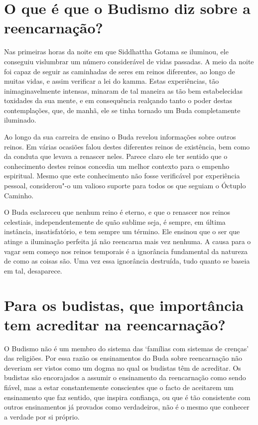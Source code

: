 \section{O que é que o Budismo diz sobre a reencarnação?}

Nas primeiras horas da noite em que Siddhattha Gotama se iluminou, ele
conseguiu vislumbrar um número considerável de vidas passadas. A meio da
noite foi capaz de seguir as caminhadas de seres em reinos diferentes,
ao longo de muitas vidas, e assim verificar a lei do kamma. Estas
experiências, tão inimaginavelmente intensas, minaram de tal maneira as
tão bem estabelecidas toxidades da sua mente, e em consequência
realçando tanto o poder destas contemplações, que, de manhã, ele se
tinha tornado um Buda completamente iluminado.

Ao longo da sua carreira de ensino o Buda revelou informações sobre
outros reinos. Em várias ocasiões falou destes diferentes reinos de
existência, bem como da conduta que levava a renascer neles. Parece
claro ele ter sentido que o conhecimento destes reinos concedia um
melhor contexto para o empenho espiritual. Mesmo que este conhecimento
não fosse verificável por experiência pessoal, considerou"-o um valioso
suporte para todos os que seguiam o Óctuplo Caminho.

O Buda esclareceu que nenhum reino é eterno, e que o renascer nos reinos
celestiais, independentemente de quão sublime seja, é sempre, em última
instância, insatisfatório, e tem sempre um término. Ele ensinou que o
ser que atinge a iluminação perfeita já não reencarna mais vez nenhuma.
A causa para o vagar sem começo nos reinos temporais é a ignorância
fundamental da natureza de como as coisas são. Uma vez essa ignorância
destruída, tudo quanto se baseia em tal, desaparece.

\section{Para os budistas, que importância tem acreditar na reencarnação?}

O Budismo não é um membro do sistema das `famílias com sistemas de
crenças' das religiões. Por essa razão os ensinamentos do Buda sobre
reencarnação não deveriam ser vistos como um dogma no qual os budistas
têm de acreditar. Os budistas são encorajados a assumir o ensinamento da
reencarnação como sendo fiável, mas a estar constantemente conscientes
que o facto de aceitarem um ensinamento que faz sentido, que inspira
confiança, ou que é tão consistente com outros ensinamentos já provados
como verdadeiros, não é o mesmo que conhecer a verdade por si próprio.

